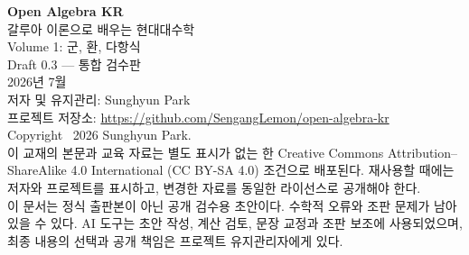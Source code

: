 \thispagestyle{empty}
\vspace*{\fill}

\begin{flushleft}
\textbf{Open Algebra KR}\\
갈루아 이론으로 배우는 현대대수학\\
Volume 1: 군, 환, 다항식\\[1.5em]

Draft 0.3 --- 통합 검수판\\
2026년 7월\\[1.5em]

저자 및 유지관리: Sunghyun Park\\
프로젝트 저장소: \url{https://github.com/SengangLemon/open-algebra-kr}\\[1.5em]

Copyright \textcopyright\ 2026 Sunghyun Park.\\[0.75em]

이 교재의 본문과 교육 자료는 별도 표시가 없는 한
Creative Commons Attribution--ShareAlike 4.0 International
(CC BY-SA 4.0) 조건으로 배포된다. 재사용할 때에는 저자와 프로젝트를 표시하고,
변경한 자료를 동일한 라이선스로 공개해야 한다.\\[1.5em]

이 문서는 정식 출판본이 아닌 공개 검수용 초안이다. 수학적 오류와 조판 문제가 남아 있을 수 있다.
AI 도구는 초안 작성, 계산 검토, 문장 교정과 조판 보조에 사용되었으며,
최종 내용의 선택과 공개 책임은 프로젝트 유지관리자에게 있다.
\end{flushleft}

\clearpage
